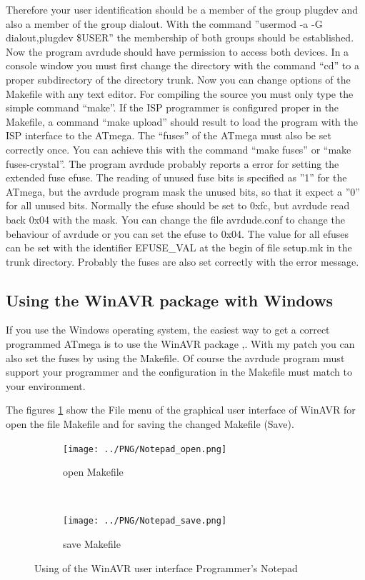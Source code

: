 Therefore your user identification should be a member of the group plugdev and also
a member of the group dialout.
With the command ''usermod -a -G dialout,plugdev \$USER'' the membership of both groups should be established.
Now the program avrdude should have permission to access both devices.
In a console window you must first change the directory with the command ``cd'' to a proper
subdirectory of the directory trunk.
Now you can change options of the Makefile with any text editor.
For compiling the source you must only type the simple command ``make''.
If the ISP programmer is configured proper in the Makefile, a command ``make upload''
should result to load the program with the ISP interface to the ATmega.
The ``fuses'' of the ATmega must also be set correctly once.
You can achieve this with the command ``make fuses'' or ``make fuses-crystal''.
The program avrdude probably reports a error for setting the extended fuse efuse.
The reading of unused fuse bits is specified as ''1'' for the ATmega, but the
avrdude program mask the unused bits, so that it expect a ''0'' for all unused bits.
Normally the efuse should be set to 0xfc, but avrdude read back 0x04 with the mask.
You can change the file avrdude.conf to change the behaviour of avrdude or
you can set the efuse to 0x04. 
The value for all efuses can be set with the identifier EFUSE\_VAL at the begin of file setup.mk
in the trunk directory.
Probably the fuses are also set correctly with the error message.

\subsection{Using the WinAVR package with Windows}
If you use the Windows operating system, the easiest way to get a correct programmed
ATmega is to use the WinAVR package \cite{winavr1},\cite{winavr2}.
With my patch \cite{winavr3} you can also set the fuses by using the Makefile.
Of course the avrdude program must support your programmer and the configuration
in the Makefile must match to your environment.

The figures \ref{fig:WinAVR1} show the File menu of the graphical user interface of WinAVR for
open the file Makefile and for saving the changed Makefile (Save).

\begin{figure}[H]
  \begin{subfigure}[b]{9cm}
    \centering
    \texttt{[image: ../PNG/Notepad\_open.png]}
    \caption{open Makefile}
  \end{subfigure}
  ~
  \begin{subfigure}[b]{9cm}
    \centering
    \texttt{[image: ../PNG/Notepad\_save.png]}
    \caption{save Makefile}
  \end{subfigure}
  \caption{Using of the WinAVR user interface Programmer's Notepad}
  \label{fig:WinAVR1}
\end{figure}


